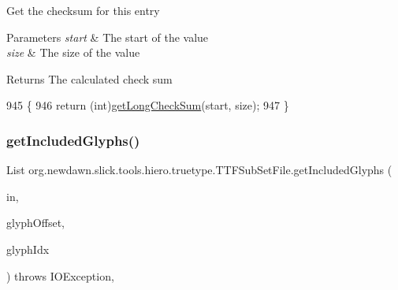 Get the checksum for this entry


\begin{DoxyParams}{Parameters}
{\em start} & The start of the value \\
\hline
{\em size} & The size of the value \\
\hline
\end{DoxyParams}
\begin{DoxyReturn}{Returns}
The calculated check sum 
\end{DoxyReturn}

\begin{DoxyCode}
945                                                  \{
946         \textcolor{keywordflow}{return} (\textcolor{keywordtype}{int})\mbox{\hyperlink{classorg_1_1newdawn_1_1slick_1_1tools_1_1hiero_1_1truetype_1_1_t_t_f_sub_set_file_a45ad92d45877b63239a2d2a849c8552d}{getLongCheckSum}}(start, size);
947     \}
\end{DoxyCode}
\mbox{\label{classorg_1_1newdawn_1_1slick_1_1tools_1_1hiero_1_1truetype_1_1_t_t_f_sub_set_file_ab464741e727d29adcb652374d2aa4849}} 
\subsubsection{\texorpdfstring{get\+Included\+Glyphs()}{getIncludedGlyphs()}}
{\footnotesize\ttfamily List org.\+newdawn.\+slick.\+tools.\+hiero.\+truetype.\+T\+T\+F\+Sub\+Set\+File.\+get\+Included\+Glyphs (\begin{DoxyParamCaption}\item[{\mbox{\hyperlink{classorg_1_1newdawn_1_1slick_1_1tools_1_1hiero_1_1truetype_1_1_font_file_reader}{Font\+File\+Reader}}}]{in,  }\item[{int}]{glyph\+Offset,  }\item[{Integer}]{glyph\+Idx }\end{DoxyParamCaption}) throws I\+O\+Exception\hspace{0.3cm}{\ttfamily [inline]}, {\ttfamily [private]}}

